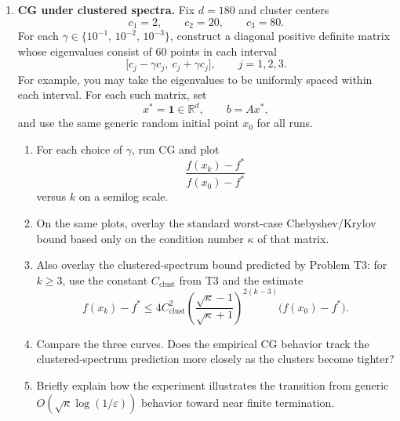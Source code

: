 \documentclass[11pt]{article}
\newcommand{\R}{\mathbb{R}}
\newcommand{\eps}{\varepsilon}
\begin{document}
\begin{enumerate}[label=\textbf{E\arabic*.}, leftmargin=0pt, itemindent=2.5em]
\item \textbf{CG under clustered spectra.}
Fix $d=180$ and cluster centers
\[
c_1=2,\qquad c_2=20,\qquad c_3=80.
\]
For each $\gamma\in\{10^{-1},\,10^{-2},\,10^{-3}\}$, construct a diagonal positive definite matrix whose eigenvalues consist of $60$ points in each interval
\[
\bigl[c_j-\gamma c_j,\ c_j+\gamma c_j\bigr],
\qquad j=1,2,3.
\]
For example, you may take the eigenvalues to be uniformly spaced within each interval. For each such matrix, set
\[
x^\ast=\mathbf{1}\in\R^d,\qquad b=Ax^\ast,
\]
and use the same generic random initial point $x_0$ for all runs.
\begin{enumerate}[label=(\alph*)]
\item For each choice of $\gamma$, run CG and plot
\[
\frac{f(x_k)-f^\ast}{f(x_0)-f^\ast}
\]
versus $k$ on a semilog scale.
\item On the same plots, overlay the standard worst-case Chebyshev/Krylov bound based only on the condition number $\kappa$ of that matrix.
\item Also overlay the clustered-spectrum bound predicted by Problem T3: for $k\ge 3$, use the constant $C_{\mathrm{clust}}$ from T3 and the estimate
\[
f(x_k)-f^\ast
\le
4C_{\mathrm{clust}}^2
\left(\frac{\sqrt{\kappa}-1}{\sqrt{\kappa}+1}\right)^{2(k-3)}
\bigl(f(x_0)-f^\ast\bigr).
\]
\item Compare the three curves. Does the empirical CG behavior track the clustered-spectrum prediction more closely as the clusters become tighter?
\item Briefly explain how the experiment illustrates the transition from generic $O(\sqrt{\kappa}\log(1/\eps))$ behavior toward near finite termination.
\end{enumerate}

\end{enumerate}
\end{document}
